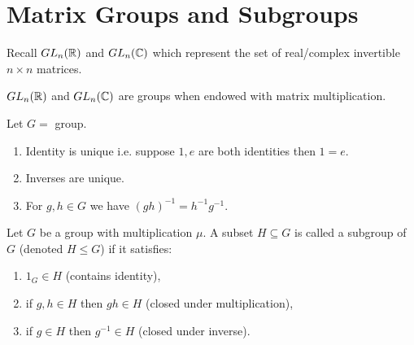 \section{Matrix Groups and Subgroups}

Recall \(GL_n(\mathbb{R})\) and \(GL_n(\mathbb{C})\) which represent the set of real/complex invertible \(n \times n\) matrices.

\begin{proposition}
    \(GL_n(\mathbb{R})\) and \(GL_n(\mathbb{C})\) are groups when endowed with matrix multiplication.
\end{proposition}

\begin{proposition}
    Let \(G =\) group.
    \begin{enumerate}[label=\arabic*)]
        \item Identity is unique i.e. suppose \(1 , e\) are both identities then \(1 = e\).
        \item Inverses are unique.
        \item For \(g, h \in G\) we have \((gh)^{-1} = h^{-1}g^{-1}\).
    \end{enumerate}
\end{proposition}

\begin{definition}[Subgroup]
    Let \(G\) be a group with multiplication \(\mu\). A subset \(H \subseteq G\) is called a subgroup of \(G\) (denoted \(H \leq G\)) if it satisfies:
    \begin{enumerate}
        \item \(1_G \in H\) (contains identity),
        \item if \(g, h \in H\) then \(gh \in H\) (closed under multiplication),
        \item if \(g \in H\) then \(g^{-1} \in H\) (closed under inverse).
    \end{enumerate}
\end{definition}

